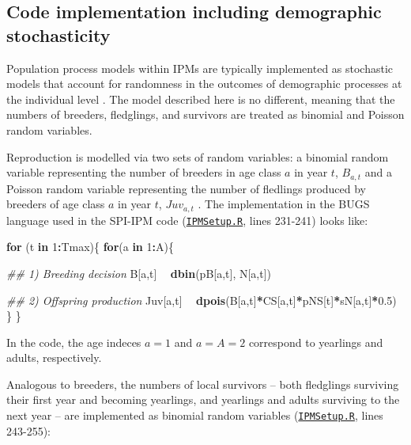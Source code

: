 \documentclass[
]{book}
\newenvironment{Shaded}{\begin{snugshade}}{\end{snugshade}}
\newcommand{\CommentTok}[1]{\textcolor[rgb]{0.56,0.35,0.01}{\textit{#1}}}
\newcommand{\ControlFlowTok}[1]{\textcolor[rgb]{0.13,0.29,0.53}{\textbf{#1}}}
\newcommand{\DecValTok}[1]{\textcolor[rgb]{0.00,0.00,0.81}{#1}}
\newcommand{\FloatTok}[1]{\textcolor[rgb]{0.00,0.00,0.81}{#1}}
\newcommand{\KeywordTok}[1]{\textcolor[rgb]{0.13,0.29,0.53}{\textbf{#1}}}
\newcommand{\NormalTok}[1]{#1}
\newcommand{\OperatorTok}[1]{\textcolor[rgb]{0.81,0.36,0.00}{\textbf{#1}}}
\newcommand{\StringTok}[1]{\textcolor[rgb]{0.31,0.60,0.02}{#1}}
\begin{document}
\hypertarget{code-implementation-including-demographic-stochasticity}{%
\subsection{Code implementation including demographic stochasticity}\label{code-implementation-including-demographic-stochasticity}}

Population process models within IPMs are typically implemented as stochastic
models that account for randomness in the outcomes of demographic processes at
the individual level \citep[``demographic stochasticity'',][]{Caswell2001, kery2011}.
The model described here is no different, meaning that the numbers of breeders,
fledglings, and survivors are treated as binomial and Poisson random variables.

Reproduction is modelled via two sets of random variables: a binomial random
variable representing the number of breeders in age class \(a\) in year \(t\),
\(B_{a,t}\) and a Poisson random variable representing the
number of fledlings produced by breeders of age class \(a\) in year \(t\),
\(Juv_{a,t}\) . The implementation in the BUGS language used in the
SPI-IPM code (\href{https://github.com/SPI-Birds/SPI-IPM/blob/main/SPI-IPM_Code/02-04_IPM_Setup\&Run/IPMSetup.R}{\texttt{IPMSetup.R}}, lines 231-241) looks like:

\begin{Shaded}
\begin{Highlighting}[]
\ControlFlowTok{for}\NormalTok{ (t }\ControlFlowTok{in} \DecValTok{1}\OperatorTok{:}\NormalTok{Tmax)\{}
  \ControlFlowTok{for}\NormalTok{(a }\ControlFlowTok{in} \DecValTok{1}\OperatorTok{:}\NormalTok{A)\{}
    
    \CommentTok{## 1) Breeding decision}
\NormalTok{    B[a,t] }\OperatorTok{~}\StringTok{ }\KeywordTok{dbin}\NormalTok{(pB[a,t], N[a,t])}
    
    \CommentTok{## 2) Offspring production}
\NormalTok{    Juv[a,t] }\OperatorTok{~}\StringTok{ }\KeywordTok{dpois}\NormalTok{(B[a,t]}\OperatorTok{*}\NormalTok{CS[a,t]}\OperatorTok{*}\NormalTok{pNS[t]}\OperatorTok{*}\NormalTok{sN[a,t]}\OperatorTok{*}\FloatTok{0.5}\NormalTok{)}
\NormalTok{  \}}
\NormalTok{\}}
\end{Highlighting}
\end{Shaded}

In the code, the age indeces \(a=1\) and \(a=A=2\) correspond to yearlings and
adults, respectively.

Analogous to breeders, the numbers of local survivors -- both fledglings surviving their
first year and becoming yearlings, and yearlings and adults surviving to the
next year -- are implemented as binomial random variables (\href{https://github.com/SPI-Birds/SPI-IPM/blob/main/SPI-IPM_Code/02-04_IPM_Setup\&Run/IPMSetup.R}{\texttt{IPMSetup.R}}, lines 243-255):
\end{document}
